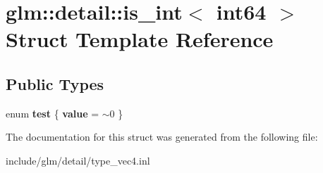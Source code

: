 \hypertarget{structglm_1_1detail_1_1is__int_3_01int64_01_4}{}\section{glm\+:\+:detail\+:\+:is\+\_\+int$<$ int64 $>$ Struct Template Reference}
\label{structglm_1_1detail_1_1is__int_3_01int64_01_4}
\subsection*{Public Types}
\begin{DoxyCompactItemize}
\item 
\mbox{\label{structglm_1_1detail_1_1is__int_3_01int64_01_4_a6d738b326fc92804b0cffae571ac3e7f}} 
enum {\bfseries test} \{ {\bfseries value} = $\sim$0
 \}
\end{DoxyCompactItemize}


The documentation for this struct was generated from the following file\+:\begin{DoxyCompactItemize}
\item 
include/glm/detail/type\+\_\+vec4.\+inl\end{DoxyCompactItemize}
